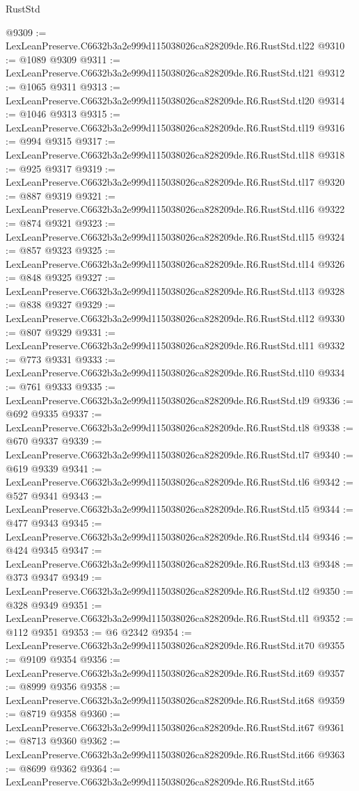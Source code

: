 \begin{lexlean}{RustStd}
\begin{coremodule}
@9309 := LexLeanPreserve.C6632b3a2e999d115038026ca828209de.R6.RustStd.tl22
@9310 := @1089 @9309
@9311 := LexLeanPreserve.C6632b3a2e999d115038026ca828209de.R6.RustStd.tl21
@9312 := @1065 @9311
@9313 := LexLeanPreserve.C6632b3a2e999d115038026ca828209de.R6.RustStd.tl20
@9314 := @1046 @9313
@9315 := LexLeanPreserve.C6632b3a2e999d115038026ca828209de.R6.RustStd.tl19
@9316 := @994 @9315
@9317 := LexLeanPreserve.C6632b3a2e999d115038026ca828209de.R6.RustStd.tl18
@9318 := @925 @9317
@9319 := LexLeanPreserve.C6632b3a2e999d115038026ca828209de.R6.RustStd.tl17
@9320 := @887 @9319
@9321 := LexLeanPreserve.C6632b3a2e999d115038026ca828209de.R6.RustStd.tl16
@9322 := @874 @9321
@9323 := LexLeanPreserve.C6632b3a2e999d115038026ca828209de.R6.RustStd.tl15
@9324 := @857 @9323
@9325 := LexLeanPreserve.C6632b3a2e999d115038026ca828209de.R6.RustStd.tl14
@9326 := @848 @9325
@9327 := LexLeanPreserve.C6632b3a2e999d115038026ca828209de.R6.RustStd.tl13
@9328 := @838 @9327
@9329 := LexLeanPreserve.C6632b3a2e999d115038026ca828209de.R6.RustStd.tl12
@9330 := @807 @9329
@9331 := LexLeanPreserve.C6632b3a2e999d115038026ca828209de.R6.RustStd.tl11
@9332 := @773 @9331
@9333 := LexLeanPreserve.C6632b3a2e999d115038026ca828209de.R6.RustStd.tl10
@9334 := @761 @9333
@9335 := LexLeanPreserve.C6632b3a2e999d115038026ca828209de.R6.RustStd.tl9
@9336 := @692 @9335
@9337 := LexLeanPreserve.C6632b3a2e999d115038026ca828209de.R6.RustStd.tl8
@9338 := @670 @9337
@9339 := LexLeanPreserve.C6632b3a2e999d115038026ca828209de.R6.RustStd.tl7
@9340 := @619 @9339
@9341 := LexLeanPreserve.C6632b3a2e999d115038026ca828209de.R6.RustStd.tl6
@9342 := @527 @9341
@9343 := LexLeanPreserve.C6632b3a2e999d115038026ca828209de.R6.RustStd.tl5
@9344 := @477 @9343
@9345 := LexLeanPreserve.C6632b3a2e999d115038026ca828209de.R6.RustStd.tl4
@9346 := @424 @9345
@9347 := LexLeanPreserve.C6632b3a2e999d115038026ca828209de.R6.RustStd.tl3
@9348 := @373 @9347
@9349 := LexLeanPreserve.C6632b3a2e999d115038026ca828209de.R6.RustStd.tl2
@9350 := @328 @9349
@9351 := LexLeanPreserve.C6632b3a2e999d115038026ca828209de.R6.RustStd.tl1
@9352 := @112 @9351
@9353 := @6 @2342
@9354 := LexLeanPreserve.C6632b3a2e999d115038026ca828209de.R6.RustStd.it70
@9355 := @9109 @9354
@9356 := LexLeanPreserve.C6632b3a2e999d115038026ca828209de.R6.RustStd.it69
@9357 := @8999 @9356
@9358 := LexLeanPreserve.C6632b3a2e999d115038026ca828209de.R6.RustStd.it68
@9359 := @8719 @9358
@9360 := LexLeanPreserve.C6632b3a2e999d115038026ca828209de.R6.RustStd.it67
@9361 := @8713 @9360
@9362 := LexLeanPreserve.C6632b3a2e999d115038026ca828209de.R6.RustStd.it66
@9363 := @8699 @9362
@9364 := LexLeanPreserve.C6632b3a2e999d115038026ca828209de.R6.RustStd.it65

\end{coremodule}
\end{lexlean}
